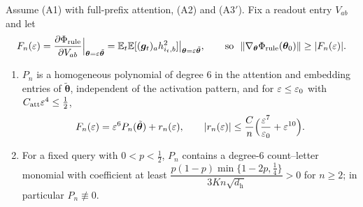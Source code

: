 \begin{lemma}
\label{lem:leading}
Assume (A1) with full-prefix attention, (A2) and (A3$'$). Fix a readout entry $V_{ab}$ and let
\[
 F_n(\initscale)=\pd{\rulecredit}{V_{ab}}\Big|_{\bm\theta=\initscale\tilde{\bm\theta}}=\E_t\E[(\bm g_t)_ah^2_{i_t,b}]\big|_{\bm\theta=\initscale\tilde{\bm\theta}},\qquad\text{so }\ \|\nabla_{\bm\theta}\rulecredit(\bm\theta_0)\|\ge|F_n(\initscale)|.
\]
\begin{enumerate}[label=(\roman*),leftmargin=*,itemsep=0pt,topsep=2pt]
\item $P_n$ is a homogeneous polynomial of degree $6$ in the attention and embedding entries of $\tilde{\bm\theta}$, independent of the activation
pattern, and for $\varepsilon\le\varepsilon_0$ with $C_{\mathrm{att}}\varepsilon^4\le\frac{1}{2}$,
\[
 F_n(\varepsilon)=\varepsilon^6P_n(\tilde{\bm\theta})+r_n(\varepsilon),\qquad |r_n(\varepsilon)|\le\frac{C}{n}\Bigl(\frac{\varepsilon^7}{\varepsilon_0}+\varepsilon^{10}\Bigr).
\]
\item For a fixed query with $0<p<\frac{1}{2}$, $P_n$ contains a degree-$6$ count--letter monomial with coefficient at least
$\dfrac{p(1-p)\min\{1-2p,\frac{1}{4}\}}{3Kn\sqrt{d_{\mathrm h}}}>0$ for $n\ge2$; in particular $P_n\not\equiv0$.
\end{enumerate}
\end{lemma}

